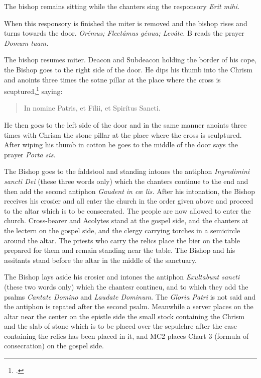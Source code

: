 \documentclass[letterpaper]{report}
\newcommand\src{\textsc{s.r.c.}}
\begin{document}
{\rubric The bishop remains sitting while the chanters sing the responsory
\textit{Erit mihi.}

\rubric When this responsory is finished the miter is removed and the bishop
rises and turns towards the door. \textit{Orémus; Flectámus génua; Leváte.} B
reads the prayer \textit{Domum tuam.}

\rubric The bishop resumes miter. Deacon and Subdeacon holding the border of
his cope, the Bishop goes to the right side of the door. He dips his thumb into
the Chrism and anoints three times the sotne pillar at the place where the
cross is scuptured,\footcite[The Pontifical says ''\textit{signat ostium,''}
which the \src, Aug. 7, 1875, n. 3364 ad VI, interprets to mean the two stone
or brick pillars at the sides of the door.][footnote 1, p. 83.]{consecranda}
saying:

\begin{quote}
   In nomine Pa\cross tris, et Fí\cross lii, et Spirítus \cross Sancti.
\end{quote}

He then goes to the left side of the door and in the same manner anoints three
times with Chrism the stone pillar at the place where the cross is sculptured.
After wiping his thumb in cotton he goes to the middle of the door says the
prayer \textit{Porta sis.}

\rubric The Bishop goes to the faldstool and standing intones the antiphon
\textit{Ingredimini sancti Dei} (these three words only) which the chanters
continue to the end and then add the second antiphon \textit{Gaudent in c\oe
lis.} After his intonation, the Bishop receives his crosier and all enter the
church in the order given above and proceed to the altar which is to be
consecrated. The people are now allowed to enter the church. Cross-bearer and
Acolytes stand at the gospel side, and the chanters at the lectern on the
gospel side, and the clergy carrying torches in a semicircle around the altar.
The priests who carry the relics place the bier on the table prepared for them
and remain standing near the table. The Bishop and his assitants stand before
the altar in the middle of the sanctuary.

\rubric The Bishop lays aside his crosier and intones the antiphon
\textit{Exultabunt sancti} (these two words only) which the chantesr contineu,
and to which they add the psalms \textit{Cantate Domino} and \textit{Laudate
Dominum.} The \textit{Gloria Patri} is not said and the antiphon is repated
after the second psalm. Meanwhile a server places on the altar near the center
on the epistle side the small stock containing the Chrism and the slab of stone
which is to be placed over the sepulchre after the case containing the relics
has been placed in it, and MC2 places Chart 3 (formula of consecration) on the
gospel side.

}
\end{document}
